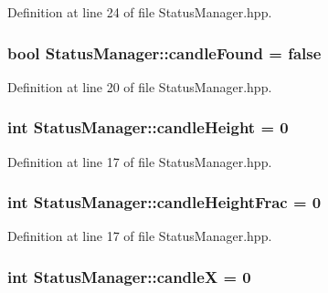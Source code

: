 Definition at line 24 of file Status\-Manager.\-hpp.

\hypertarget{classStatusManager_addac8003cb381bc134170516966135aa}{
\subsubsection[{candle\-Found}]{\setlength{\rightskip}{0pt plus 5cm}bool Status\-Manager\-::candle\-Found = false\hspace{0.3cm}{\ttfamily [static]}}}\label{classStatusManager_addac8003cb381bc134170516966135aa}


Definition at line 20 of file Status\-Manager.\-hpp.

\hypertarget{classStatusManager_a1a9f7a4fdb19e56e3f8352a78ea4648e}{
\subsubsection[{candle\-Height}]{\setlength{\rightskip}{0pt plus 5cm}int Status\-Manager\-::candle\-Height = 0\hspace{0.3cm}{\ttfamily [static]}}}\label{classStatusManager_a1a9f7a4fdb19e56e3f8352a78ea4648e}


Definition at line 17 of file Status\-Manager.\-hpp.

\hypertarget{classStatusManager_ac813f7d48ed51e0246126a53775c5b65}{
\subsubsection[{candle\-Height\-Frac}]{\setlength{\rightskip}{0pt plus 5cm}int Status\-Manager\-::candle\-Height\-Frac = 0\hspace{0.3cm}{\ttfamily [static]}}}\label{classStatusManager_ac813f7d48ed51e0246126a53775c5b65}


Definition at line 17 of file Status\-Manager.\-hpp.

\hypertarget{classStatusManager_a53de0b4eac2d76c8b2d075b8020d1c7f}{
\subsubsection[{candle\-X}]{\setlength{\rightskip}{0pt plus 5cm}int Status\-Manager\-::candle\-X = 0\hspace{0.3cm}{\ttfamily [static]}}}\label{classStatusManager_a53de0b4eac2d76c8b2d075b8020d1c7f}


